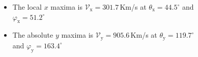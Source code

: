 \documentclass{beamer}
\begin{document}
\begin{frame}
\begin{columns}
{\begin{itemize}
\item The local $x$ maxima is 
$\mathcal{V}_{\mathrm{x}} = 301.7 $\,Km/s at
$\theta_{\mathrm{x}} = 44.5^{\circ}$ and
$\varphi_{\mathrm{x}} = 51.2^{\circ}$

\item The absolute $y$ maxima is 
$\mathcal{V}_{\mathrm{y}} = 905.6$\,Km/s at 
$\theta_{\mathrm{y}} = 119.7^{\circ}$ and
$\varphi_{\mathrm{y}} = 163.4^{\circ}$

\end{itemize}

}

\begin{center}

\vspace{-8mm}
\begin{figure}[h!]
\end{figure}
\end{center}
\end{columns}
\end{frame}
\end{document}
